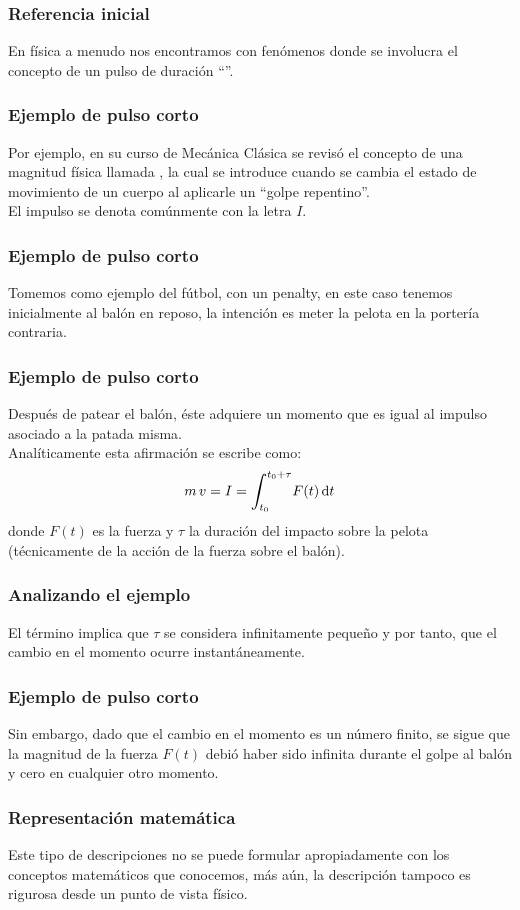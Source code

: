 \documentclass[12pt]{beamer}
\begin{document}
\begin{frame}
\frametitle{Referencia inicial}
En física a menudo nos encontramos con fenómenos donde se involucra el concepto de un pulso de duración \enquote{}.
\end{frame}
\begin{frame}
\frametitle{Ejemplo de pulso corto}
Por ejemplo, en su curso de Mecánica Clásica se revisó el concepto de una magnitud física llamada , \pause la cual se introduce cuando se cambia el estado de movimiento de un cuerpo al aplicarle un \enquote{golpe repentino}.
\\
\bigskip
\pause
El impulso se denota comúnmente con la letra $I$.
\end{frame}
\begin{frame}
\frametitle{Ejemplo de pulso corto}
Tomemos como ejemplo del fútbol, con un penalty, \pause en este caso tenemos inicialmente al balón en reposo, \pause la intención es meter la pelota en la portería contraria.
\end{frame}
\begin{frame}
\frametitle{Ejemplo de pulso corto}
Después de patear el balón, éste adquiere un momento que es igual al impulso asociado a la patada misma.
\\
\bigskip
\pause
Analíticamente esta afirmación se escribe como:
\pause
\begin{align*}
m \, v = I = \scaleint{6ex}_{\bs t_{0}}^{t_{0} + \tau} F (t) \dd{t}
\end{align*}
donde $F (t)$ es la fuerza y $\tau$ la duración del impacto sobre la pelota (técnicamente de la acción de la fuerza sobre el balón).
\end{frame}
\begin{frame}
\frametitle{Analizando el ejemplo}
El término  implica que $\tau$ se considera infinitamente pequeño \pause y por tanto, que el cambio en el momento ocurre instantáneamente.
\end{frame}
\begin{frame}
\frametitle{Ejemplo de pulso corto}
Sin embargo, dado que el cambio en el momento es un número finito, \pause se sigue que la magnitud de la fuerza $F (t)$ debió haber sido infinita durante el golpe al balón y cero en cualquier otro momento.
\end{frame}
\begin{frame}
\frametitle{Representación matemática}
Este tipo de descripciones no se puede formular apropiadamente con los conceptos matemáticos que conocemos, más aún, la descripción tampoco es rigurosa desde un punto de vista físico.
\end{frame}
\end{document}

